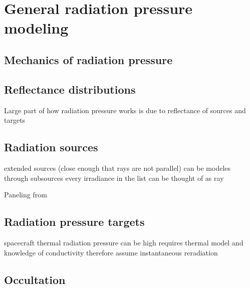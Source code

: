 \section{General radiation pressure modeling}


\subsection{Mechanics of radiation pressure}


\subsection{Reflectance distributions}
Large part of how radiation pressure works is due to reflectance of sources and targets

\subsection{Radiation sources}
extended sources (close enough that rays are not parallel) can be modeles through subsources
every irradiance in the list can be thought of as ray

Paneling from ~\cite{Knocke1989}

\subsection{Radiation pressure targets}

spacecraft thermal radiation pressure can be high
requires thermal model and knowledge of conductivity
therefore assume instantaneous reradiation



\subsection{Occultation}



